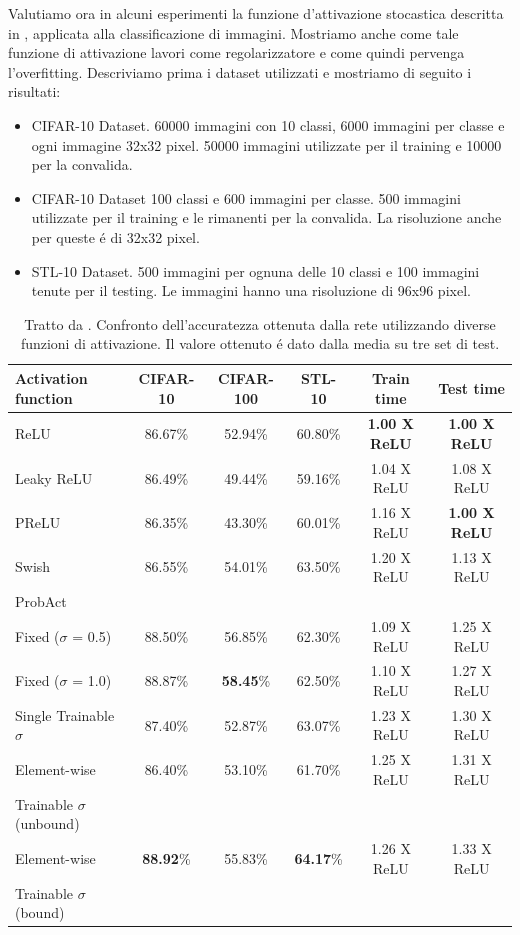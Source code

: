 \documentclass[a4paper,12pt]{report}
\begin{document}
 Valutiamo ora in alcuni esperimenti la funzione d'attivazione stocastica descritta in \cite{lee2019probact}, applicata alla classificazione di immagini. Mostriamo anche come tale funzione di attivazione lavori come regolarizzatore e come quindi pervenga l'overfitting. Descriviamo prima i dataset utilizzati e mostriamo di seguito i risultati:
 \begin{itemize}
  \item CIFAR-10 Dataset. 60000 immagini con 10 classi, 6000 immagini per classe e ogni immagine 32x32 pixel. 50000 immagini utilizzate per il training e 10000 per la convalida. 
  \item CIFAR-10 Dataset 100 classi e 600 immagini per classe. 500 immagini utilizzate per il training e le rimanenti per la convalida. La risoluzione anche per queste \'e di 32x32 pixel. 
  \item STL-10 Dataset. 500 immagini per ognuna delle 10 classi e 100 immagini tenute per il testing. Le immagini hanno una risoluzione di 96x96 pixel.
 \end{itemize}
 
 \begin{table}[h]\caption{Tratto da \cite{lee2019probact}. Confronto dell'accuratezza ottenuta dalla rete utilizzando diverse funzioni di attivazione. Il valore ottenuto \'e dato dalla media su tre set di test.}\label{ActFuncTestTab}
   \centering
   \begin{tabular}[h]{|l|c|c|c|c|c|}
    \hline
   Activation function & CIFAR-10 & CIFAR-100 & STL-10 & Train time & Test time \\ \hline
   ReLU & 86.67\% & 52.94\% & 60.80\% & \textbf{1.00 X ReLU} & \textbf{1.00 X ReLU} \\ 
   Leaky ReLU & 86.49\% & 49.44\% & 59.16\% & 1.04 X ReLU & 1.08 X ReLU \\
   PReLU & 86.35\% & 43.30\% & 60.01\% & 1.16 X ReLU & \textbf{1.00 X ReLU} \\
   Swish & 86.55\% & 54.01\% & 63.50\% & 1.20 X ReLU & 1.13 X ReLU \\
   \hline
   ProbAct & & & & & \\
   \quad Fixed ($\sigma$ = 0.5) & 88.50\% & 56.85\% & 62.30\% & 1.09 X ReLU & 1.25 X ReLU \\
   \quad Fixed ($\sigma$ = 1.0) & 88.87\% & \textbf{58.45}\% & 62.50\% & 1.10 X ReLU & 1.27 X ReLU \\
   \quad Single Trainable $\sigma$ & 87.40\% & 52.87\% & 63.07\% & 1.23 X ReLU & 1.30 X ReLU \\
   \quad Element-wise & 86.40\% & 53.10\% & 61.70\% & 1.25 X ReLU & 1.31 X ReLU \\
   \qquad Trainable $\sigma$ (unbound)  & & & & & \\
   \quad Element-wise & \textbf{88.92}\% & 55.83\% & \textbf{64.17}\% & 1.26 X ReLU & 1.33 X ReLU \\
   \qquad Trainable $\sigma$ (bound)  & & & & & \\
   \hline
   \end{tabular}
  \end{table}
  
\end{document}
